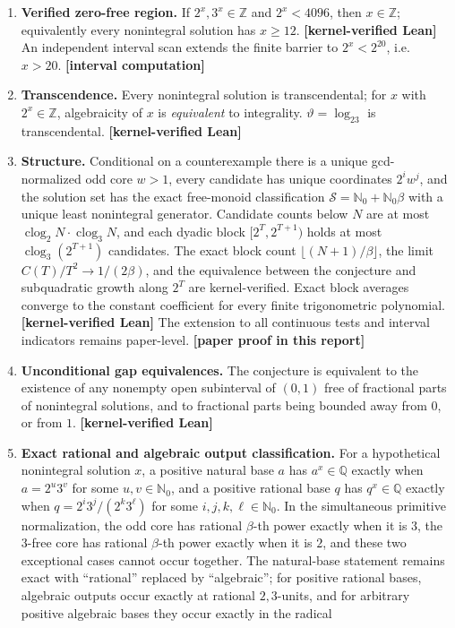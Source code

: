 \documentclass[11pt,oneside]{article}
\theoremstyle{definition}
\theoremstyle{remark}
\newcommand{\Nzero}{\mathbb N_0}
\newcommand{\Z}{\mathbb Z}
\newcommand{\Q}{\mathbb Q}
\newcommand{\thetaq}{\vartheta}
\newcommand{\Sol}{\mathcal S}
\newcommand{\clog}{\operatorname{clog}}
\newcommand{\statuslean}{\textcolor{leanblue}{\textbf{[kernel-verified Lean]}}}
\newcommand{\statusnew}{\textcolor{newgreen}{\textbf{[paper proof in this report]}}}
\newcommand{\statuscomp}{\textcolor{computeviolet}{\textbf{[interval computation]}}}
\begin{document}
\begin{enumerate}
\item \textbf{Verified zero-free region.}  If $2^x,3^x\in\Z$ and $2^x<4096$, then $x\in\Z$;
equivalently every nonintegral solution has $x\ge12$.  \statuslean{}  An independent interval
scan extends the finite barrier to $2^x<2^{20}$, i.e.\ $x>20$.  \statuscomp
\item \textbf{Transcendence.}  Every nonintegral solution is transcendental; for $x$ with
$2^x\in\Z$, algebraicity of $x$ is \emph{equivalent} to integrality.  $\thetaq=\log_23$ is
transcendental.  \statuslean
\item \textbf{Structure.}  Conditional on a counterexample there is a unique gcd-normalized
odd core $w>1$, every candidate has unique coordinates $2^iw^j$, and the solution set has the
exact free-monoid classification $\Sol=\Nzero+\Nzero\beta$ with a unique least nonintegral
generator.  Candidate counts below $N$ are at most $\clog_2N\cdot\clog_3N$, and each dyadic
block $[2^T,2^{T+1})$ holds at most $\clog_3(2^{T+1})$ candidates.  The exact block count
$\lfloor(N+1)/\beta\rfloor$, the limit $C(T)/T^2\to1/(2\beta)$, and the equivalence between
the conjecture and subquadratic growth along $2^T$ are kernel-verified.  Exact block averages
converge to the constant coefficient for every finite trigonometric polynomial.  \statuslean{}
The extension to all continuous tests and interval indicators remains paper-level. \statusnew
\item \textbf{Unconditional gap equivalences.}  The conjecture is equivalent to the existence
of any nonempty open subinterval of $(0,1)$ free of fractional parts of nonintegral
solutions, and to fractional parts being bounded away from $0$, or from $1$.  \statuslean
\item \textbf{Exact rational and algebraic output classification.}  For a hypothetical nonintegral
solution $x$, a positive natural base $a$ has $a^x\in\Q$ exactly when
$a=2^u3^v$ for some $u,v\in\Nzero$, and a positive rational base $q$ has
$q^x\in\Q$ exactly when $q=2^i3^j/(2^k3^\ell)$ for some
$i,j,k,\ell\in\Nzero$.  In the simultaneous primitive normalization, the odd core has
rational $\beta$-th power exactly when it is $3$, the $3$-free core has rational
$\beta$-th power exactly when it is $2$, and these two exceptional cases cannot occur
together.  The natural-base statement remains exact with ``rational'' replaced by
``algebraic''; for positive rational bases, algebraic outputs occur exactly at rational
$2,3$-units, and for arbitrary positive algebraic bases they occur exactly in the radical

\end{enumerate}
\end{document}
